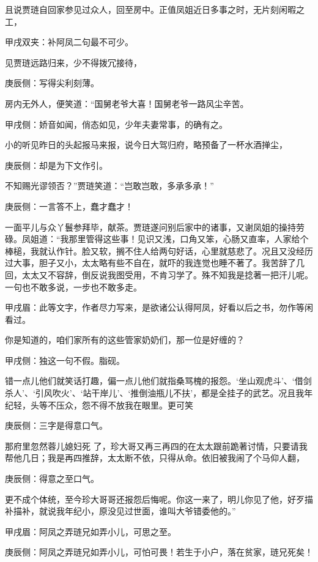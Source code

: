\begin{parag}
    且说贾琏自回家参见过众人，回至房中。正值凤姐近日多事之时，无片刻闲暇之工，\begin{note}甲戌双夹：补阿凤二句最不可少。\end{note}见贾琏远路归来，少不得拨冗接待，\begin{note}庚辰侧：写得尖利刻薄。\end{note}房内无外人，便笑道：“国舅老爷大喜！国舅老爷一路风尘辛苦。\begin{note}甲戌侧：娇音如闻，俏态如见，少年夫妻常事，的确有之。\end{note}小的听见昨日的头起报马来报，说今日大驾归府，略预备了一杯水酒掸尘，\begin{note}庚辰侧：却是为下文作引。\end{note}不知赐光谬领否？”贾琏笑道：“岂敢岂敢，多承多承！”\begin{note}庚辰侧：一言答不上，蠢才蠢才！\end{note}一面平儿与众丫鬟参拜毕，献茶。贾琏遂问别后家中的诸事，又谢凤姐的操持劳碌。凤姐道：“我那里管得这些事！见识又浅，口角又笨，心肠又直率，人家给个棒槌，我就认作针。脸又软，搁不住人给两句好话，心里就慈悲了。况且又没经历过大事，胆子又小，太太略有些不自在，就吓的我连觉也睡不著了。我苦辞了几回，太太又不容辞，倒反说我图受用，不肯习学了。殊不知我是捻著一把汗儿呢。一句也不敢多说，一步也不敢多走。\begin{note}甲戌眉：此等文字，作者尽力写来，是欲诸公认得阿凤，好看以后之书，勿作等闲看过。\end{note}你是知道的，咱们家所有的这些管家奶奶们，那一位是好缠的？\begin{note}甲戌侧：独这一句不假。脂砚。\end{note}错一点儿他们就笑话打趣，偏一点儿他们就指桑骂槐的报怨。‘坐山观虎斗’、‘借剑杀人’、‘引风吹火’、‘站干岸儿’、‘推倒油瓶儿不扶’，都是全挂子的武艺。况且我年纪轻，头等不压众，怨不得不放我在眼里。更可笑\begin{note}庚辰侧：三字是得意口气。\end{note}那府里忽然蓉儿媳妇死 了，珍大哥又再三再四的在太太跟前跪著讨情，只要请我帮他几日；我是再四推辞，太太断不依，只得从命。依旧被我闹了个马仰人翻，\begin{note}庚辰侧：得意之至口气。\end{note}更不成个体统，至今珍大哥哥还报怨后悔呢。你这一来了，明儿你见了他，好歹描补描补，就说我年纪小，原没见过世面，谁叫大爷错委他的。”\begin{note}甲戌眉：阿凤之弄琏兄如弄小儿，可思之至。\end{note}\begin{note}庚辰侧：阿凤之弄琏兄如弄小儿，可怕可畏！若生于小户，落在贫家，琏兄死矣！\end{note}
\end{parag}


